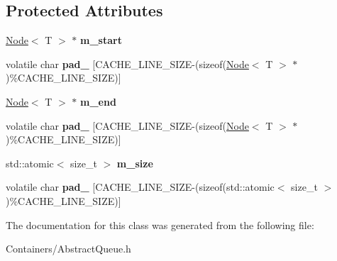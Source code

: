 \subsection*{Protected Attributes}
\begin{DoxyCompactItemize}
\item 
\hypertarget{class_d_x_1_1_queue_a3e41a2b5013c79a3909f83a2ce65446b}{\hyperlink{struct_d_x_1_1_node}{Node}$<$ T $>$ $\ast$ {\bfseries m\-\_\-start}}\label{class_d_x_1_1_queue_a3e41a2b5013c79a3909f83a2ce65446b}

\item 
\hypertarget{class_d_x_1_1_queue_afb07bbecbb79cce77c0062721a8caa4d}{volatile char {\bfseries pad\-\_} \mbox{[}C\-A\-C\-H\-E\-\_\-\-L\-I\-N\-E\-\_\-\-S\-I\-Z\-E-\/(sizeof(\hyperlink{struct_d_x_1_1_node}{Node}$<$ T $>$ $\ast$)\%C\-A\-C\-H\-E\-\_\-\-L\-I\-N\-E\-\_\-\-S\-I\-Z\-E)\mbox{]}}\label{class_d_x_1_1_queue_afb07bbecbb79cce77c0062721a8caa4d}

\item 
\hypertarget{class_d_x_1_1_queue_a24bd17c6310053ad9e43f84a7d88e5ab}{\hyperlink{struct_d_x_1_1_node}{Node}$<$ T $>$ $\ast$ {\bfseries m\-\_\-end}}\label{class_d_x_1_1_queue_a24bd17c6310053ad9e43f84a7d88e5ab}

\item 
\hypertarget{class_d_x_1_1_queue_a7f9ffb15fb04758bb68af88c676ad4d7}{volatile char {\bfseries pad\-\_} \mbox{[}C\-A\-C\-H\-E\-\_\-\-L\-I\-N\-E\-\_\-\-S\-I\-Z\-E-\/(sizeof(\hyperlink{struct_d_x_1_1_node}{Node}$<$ T $>$ $\ast$)\%C\-A\-C\-H\-E\-\_\-\-L\-I\-N\-E\-\_\-\-S\-I\-Z\-E)\mbox{]}}\label{class_d_x_1_1_queue_a7f9ffb15fb04758bb68af88c676ad4d7}

\item 
\hypertarget{class_d_x_1_1_queue_a4c312cbb0fd52de3cddbf53faec25d49}{std\-::atomic$<$ size\-\_\-t $>$ {\bfseries m\-\_\-size}}\label{class_d_x_1_1_queue_a4c312cbb0fd52de3cddbf53faec25d49}

\item 
\hypertarget{class_d_x_1_1_queue_ae72b76603322862275fa059e1a732d42}{volatile char {\bfseries pad\-\_} \mbox{[}C\-A\-C\-H\-E\-\_\-\-L\-I\-N\-E\-\_\-\-S\-I\-Z\-E-\/(sizeof(std\-::atomic$<$ size\-\_\-t $>$)\%C\-A\-C\-H\-E\-\_\-\-L\-I\-N\-E\-\_\-\-S\-I\-Z\-E)\mbox{]}}\label{class_d_x_1_1_queue_ae72b76603322862275fa059e1a732d42}

\end{DoxyCompactItemize}


The documentation for this class was generated from the following file\-:\begin{DoxyCompactItemize}
\item 
Containers/Abstract\-Queue.\-h\end{DoxyCompactItemize}

